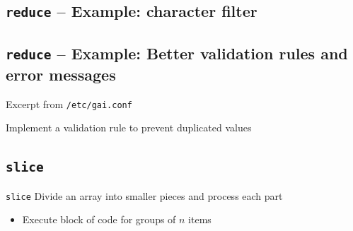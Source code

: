 \documentclass[english,aspectratio=43,nohandout]{beamer}
\begin{document}
\subsection{\texttt{reduce} -- Example: character filter}

\begin{frame}{\insertsection}{\insertsubsection}
\pause

\end{frame}

\subsection{\texttt{reduce} -- Example: Better validation rules and error messages}

\begin{frame}{\insertsection}{\insertsubsection}
Excerpt from \lstinline{/etc/gai.conf}


\vspace{\baselineskip}\pause

Implement a validation rule to prevent duplicated values
\end{frame}

\begin{frame}{\insertsection}{\insertsubsection}

\end{frame}

\begin{frame}{\insertsection}{\insertsubsection}

\end{frame}

\subsection{\texttt{slice}}

\begin{frame}{\insertsection}{\insertsubsection}

\begin{block}{\texttt{slice}}
Divide an array into smaller pieces and process each part
\end{block}

\vspace{\baselineskip}\pause

\begin{itemize}
\item Execute block of code for groups of $n$ items
\end{itemize}
\end{frame}
\end{document}
